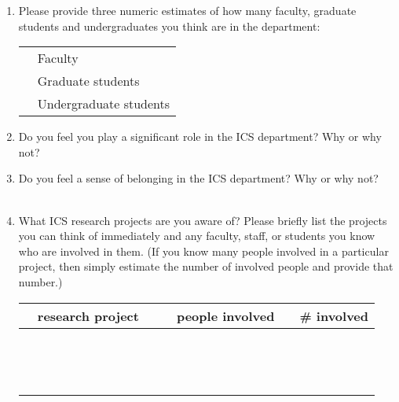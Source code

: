 \begin{enumerate}
\item{Please provide three numeric estimates of how many faculty, graduate
  students and  undergraduates you think are in the department:}\\
  \begin{tabular}{ll}
    \underline{  }\underline{  }\underline{  }  & Faculty \\
    \underline{  }\underline{  }\underline{  }  & Graduate students \\
    \underline{  }\underline{  }\underline{  }  & Undergraduate students \\
  \end{tabular}

\item{Do you feel you play a significant role in the ICS department?  Why
  or why not?}
\\

\item{Do you feel a sense of belonging in the ICS department?  Why or why not?}
\\ \\

\item{What ICS research projects are you aware of?  Please briefly list the
  projects you can think of immediately and any faculty, staff, or students
  you know who are involved in them. (If you know many people involved in a
  particular project, then simply estimate the number of involved people
  and provide that number.)}\\
  \begin{tabular}{ccc|ccc|c}
    & research project & & &  people involved    & & \# involved    \\ \hline
    &&&&&&\\ &&&&&&\\ &&&&&&\\ &&&&&&\\ &&&&&&\\ &&&&&&\\ &&&&&&\\ &&&&&&\\
    &&&&&&\\ &&&&&&\\ &&&&&&\\ &&&&&&\\ &&&&&&\\ &&&&&&\\
  \end{tabular}


\end{enumerate}
